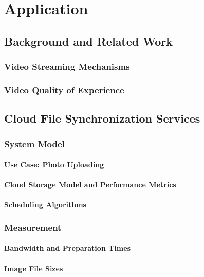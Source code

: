 \chapter{Application}\label{chap:application}

\section{Background and Related Work}
\subsection{Video Streaming Mechanisms}
\subsection{Video Quality of Experience}

\section{Cloud File Synchronization Services}
\cite{Schwartz2014a}

\subsection{System Model}
\subsubsection*{Use Case: Photo Uploading}
\subsubsection*{Cloud Storage Model and Performance Metrics}
\subsubsection*{Scheduling Algorithms}

\subsection{Measurement}
\subsubsection*{Bandwidth and Preparation Times}
\subsubsection*{Image File Sizes}

